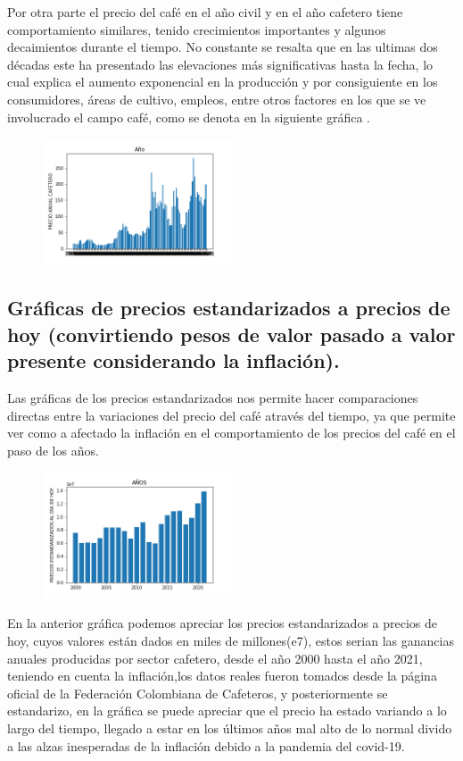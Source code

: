 \documentclass[11pt,letterpaper,twocolumn]{article}
\begin{document}
Por otra parte el precio del café en el año civil y en el año
cafetero tiene comportamiento similares, tenido crecimientos
importantes y algunos decaimientos durante el tiempo. No constante
se resalta que en las ultimas dos décadas este ha presentado las
elevaciones más significativas hasta la fecha, lo cual explica el
aumento exponencial en la producción y por consiguiente en los
consumidores, áreas de cultivo, empleos, entre otros factores en los
que se ve involucrado el campo café, como se denota en la siguiente
gráfica .
 \begin{figure}[H]
            \centering
            \includegraphics[width=0.5\textwidth]{imagenes/punto2_b.png}
            \caption{\label{fig2:frog}}
        \end{figure}
        


\subsection{Gráficas de precios estandarizados a precios de hoy (convirtiendo pesos de valor pasado a valor presente considerando la inflación).}
Las gráficas de los precios estandarizados nos permite hacer comparaciones directas entre la variaciones del precio del café através del tiempo, ya que permite ver como a afectado la inflación en el comportamiento de los  precios del café en el paso de los años.
\begin{figure}[H]
            \includegraphics[width=0.5\textwidth]{imagenes/punto3.png}
            \caption{\label{fig3:frog}}
        \end{figure}
En la anterior gráfica podemos apreciar los precios estandarizados a precios de hoy, cuyos valores están  dados en miles de millones(e7), estos serian las ganancias anuales producidas por sector cafetero,  desde el año 2000 hasta el año 2021, teniendo en cuenta la inflación,los datos reales fueron tomados desde  la página oficial de la Federación Colombiana de Cafeteros, y posteriormente se estandarizo, en la gráfica se puede  apreciar que el precio ha estado variando a lo largo del tiempo, llegado a estar en los últimos años mal alto de lo normal divido a las alzas inesperadas de la inflación debido a la pandemia del covid-19.
\end{document}
